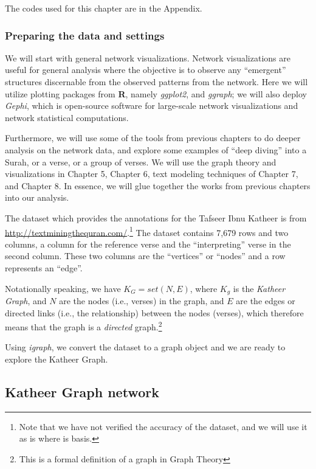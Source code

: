 \documentclass[
]{article}
\begin{document}
The codes used for this chapter are in the Appendix.

\hypertarget{preparing-the-data-and-settings}{%
\subsubsection{Preparing the data and settings}\label{preparing-the-data-and-settings}}

We will start with general network visualizations. Network visualizations are useful for general analysis where the objective is to observe any ``emergent'' structures discernable from the observed patterns from the network. Here we will utilize plotting packages from \textbf{R}, namely \emph{ggplot2}, and \emph{ggraph}; we will also deploy \emph{Gephi}, which is open-source software for large-scale network visualizations and network statistical computations.

Furthermore, we will use some of the tools from previous chapters to do deeper analysis on the network data, and explore some examples of ``deep diving'' into a Surah, or a verse, or a group of verses. We will use the graph theory and visualizations in Chapter 5, Chapter 6, text modeling techniques of Chapter 7, and Chapter 8. In essence, we will glue together the works from previous chapters into our analysis.

The dataset which provides the annotations for the Tafseer Ibnu Katheer is from \url{http://textminingthequran.com/}.\footnote{Note that we have not verified the accuracy of the dataset, and we will use it as is where is basis.} The dataset contains 7,679 rows and two columns, a column for the reference verse and the ``interpreting'' verse in the second column. These two columns are the ``vertices'' or ``nodes'' and a row represents an ``edge''.

Notationally speaking, we have \(K_G = set(N,E)\), where \(K_g\) is the \emph{Katheer Graph}, and \(N\) are the nodes (i.e., verses) in the graph, and \(E\) are the edges or directed links (i.e., the relationship) between the nodes (verses), which therefore means that the graph is a \emph{directed} graph.\footnote{This is a formal definition of a graph in Graph Theory}

Using \emph{igraph}, we convert the dataset to a graph object and we are ready to explore the Katheer Graph.

\hypertarget{Katheer-graph-network}{%
\subsection{Katheer Graph network}\label{Katheer-graph-network}}
\end{document}
